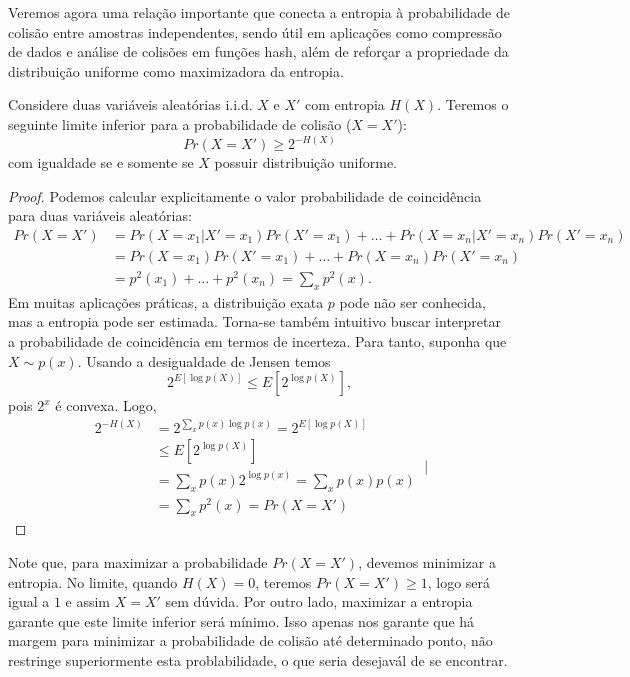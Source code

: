 Veremos agora uma relação importante que conecta a entropia à probabilidade de
colisão entre amostras independentes, sendo útil em aplicações como compressão
de dados e análise de colisões em funções hash, além de reforçar a propriedade
da distribuição uniforme como maximizadora da entropia.
\begin{proposition}
    Considere duas variáveis aleatórias i.i.d. $X$ e $X'$ com entropia $H(X)$.
    Teremos o seguinte limite inferior para a probabilidade de colisão ($X = X'$):
    \begin{equation}
      Pr(X = X') \geq 2^{-H(X)}
    \end{equation}
    com igualdade se e somente se $X$ possuir distribuição uniforme.
\end{proposition}
\begin{proof}
  Podemos calcular explicitamente o valor probabilidade de coincidência para duas variáveis aleatórias:
  \begin{subequations}
    \begin{align}
      Pr(X = X') &= Pr(X=x_1|X'=x_1)Pr(X'=x_1) + \ldots + Pr(X=x_n|X'=x_n)Pr(X'=x_n) \\
        &= Pr(X=x_1)Pr(X'=x_1) + \ldots + Pr(X=x_n)Pr(X'=x_n) \\
        &= p^2(x_1) + \ldots + p^2(x_n) = \sum_x p^2(x) .\label{eq:colprob}
    \end{align}
  \end{subequations}
  Em muitas aplicações práticas, a distribuição exata $p$ pode não ser conhecida,
  mas a entropia pode ser estimada. Torna-se também intuitivo buscar interpretar a probabilidade de coincidência em termos de incerteza.
  Para tanto, suponha que $X \sim p(x)$. Usando a desigualdade de Jensen temos
  \begin{equation}
    2^{E[\log p(X)]} \leq E[2^{\log p(X)}] ,
  \end{equation}
  pois $2^x$ é convexa. Logo,
  \begin{subequations}
    \begin{align}
      2^{-H(X)} &= 2^{\sum_x p(x) \log p(x)} = 2^{E[\log p(X)]} \\
                &\leq E[2^{\log p(X)}] \\
                &= \sum_x p(x) 2^{\log p(x)} = \sum_x p(x)p(x) \\
                &= \sum_x p^2(x) = Pr(X = X')
    \end{align}
│ \end{subequations}
\end{proof}
Note que, para maximizar a probabilidade $Pr(X = X')$, devemos minimizar a entropia.
No limite, quando $H(X)=0$, teremos $Pr(X = X') \geq 1$, logo será igual a $1$ e assim $X = X'$ sem dúvida.
Por outro lado, maximizar a entropia garante que este limite inferior será mínimo.
Isso apenas nos garante que há margem para minimizar a probabilidade de colisão até determinado ponto,
não restringe superiormente esta problabilidade, o que seria desejavál de se encontrar.


